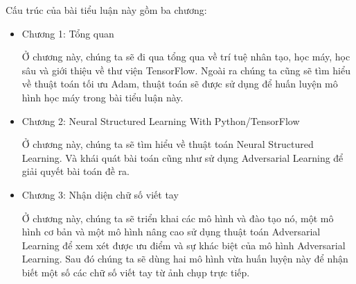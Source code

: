 Cấu trúc của bài tiểu luận này gồm ba chương:

\begin{itemize}
\item Chương 1: Tổng quan

     Ở chương này, chúng ta sẽ đi qua tổng qua về trí tuệ nhân tạo, học máy, học sâu và giới thiệu về thư viện TensorFlow.
     Ngoài ra chúng ta cũng sẽ tìm hiểu về thuật toán tối ưu Adam, thuật toán sẽ được sử dụng để huấn luyện mô hình học máy trong bài tiểu luận này.
\item Chương 2: Neural Structured Learning With Python/TensorFlow

    Ở chương này, chúng ta sẽ tìm hiểu về thuật toán Neural Structured Learning. Và khái quát bài toán cũng như sử dụng Adversarial Learning để giải quyết bài toán đề ra.

\item Chương 3: Nhận diện chữ số viết tay

    Ở chương này, chúng ta sẽ triển khai các mô hình và đào tạo nó, một mô hình cơ bản và một mô hình nâng cao sử dụng thuật toán Adversarial Learning để xem xét được ưu điểm 
    và sự khác biệt của mô hình Adversarial Learning. Sau đó chúng ta sẽ dùng hai mô hình vừa huấn luyện này để nhận biết một số các chữ số viết tay từ ảnh chụp trực tiếp.
\end{itemize}


